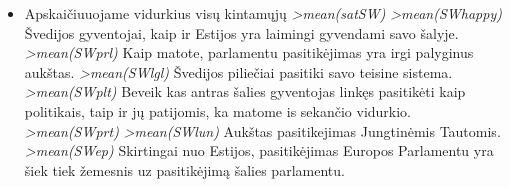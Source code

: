 \documentclass[a4paper]{article}
\begin{document}
\begin{enumerate}
\begin{itemize}
\item Apskaičiuuojame vidurkius visų kintamųjų
\newline \textit{ >mean(satSW) 
   }
\newline \textit{ >mean(SWhappy) 
   }
\newline Švedijos gyventojai, kaip ir Estijos yra laimingi gyvendami savo šalyje.
\newline \textit{ >mean(SWprl) 
   }
\newline Kaip matote, parlamentu pasitikėjimas yra irgi palyginus aukštas.
\newline \textit{ >mean(SWlgl) 
   }
\newline Švedijos piliečiai pasitiki savo teisine sistema.
\newline \textit{ >mean(SWplt) 
   }
\newline Beveik kas antras šalies gyventojas linkęs pasitikėti kaip politikais, taip ir jų patijomis, ka matome is sekančio vidurkio.
\newline \textit{ >mean(SWprt) 
   }
\newline \textit{ >mean(SWlun) 
   }
\newline Aukštas pasitikejimas Jungtinėmis Tautomis.
\newline \textit{ >mean(SWep) 
  }
\newline Skirtingai nuo Estijos, pasitikėjimas Europos Parlamentu yra šiek tiek žemesnis uz pasitikėjimą šalies parlamentu.




\end{itemize}

\end{enumerate}

\end{document}
